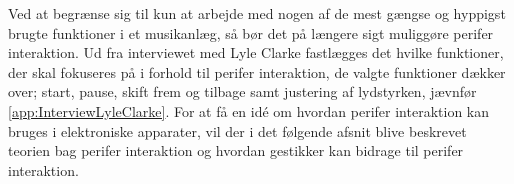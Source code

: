 Ved at begrænse sig til kun at arbejde med nogen af de mest gængse og hyppigst brugte funktioner i et musikanlæg, så bør det på længere sigt muliggøre perifer interaktion. Ud fra interviewet med Lyle Clarke fastlægges det hvilke funktioner, der skal fokuseres på i forhold til perifer interaktion, de valgte funktioner dækker over; start, pause, skift frem og tilbage samt justering af lydstyrken, jævnfør \autoref{app:InterviewLyleClarke}.\blankline
%
For at få en idé om hvordan perifer interaktion kan bruges i elektroniske apparater, vil der i det følgende afsnit blive beskrevet teorien bag perifer interaktion og hvordan gestikker kan bidrage til perifer interaktion. 

